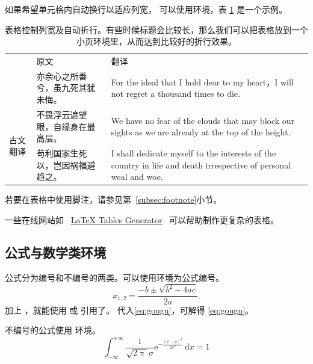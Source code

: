 如果希望单元格内自动换行以适应列宽，
可以使用环境，表 \ref{tab:tabularx} 是一个示例。
\begin{table}[htbp]
	\centering
	\begin{minipage}{0.9\textwidth}
		\caption{表格控制列宽及自动折行。有些时候标题会比较长，那么我们可以把表格放到一个小页环境里，从而达到比较好的折行效果。}
		\label{tab:tabularx}
		\begin{tabularx}{\textwidth}{p{4em}p{7.5em}X}
			\toprule
									& \multicolumn{1}{l}{原文}         & \multicolumn{1}{l}{翻译}                                                                                         \\
			\cmidrule(l){2-3}
									& 亦余心之所善兮，虽九死其犹未悔。 & For the ideal that I hold dear to my heart，I will not regret a thousand times to die.                           \\
			\cmidrule(l){2-3}
			\multirow{3}{*}{古文翻译} & 不畏浮云遮望眼，自缘身在最高层。 & We have no fear of the clouds that may block our sights as we are already at the top of the height.              \\
			\cmidrule(l){2-3}
									& 苟利国家生死以，岂因祸福避趋之。 & I shall dedicate myself to the interests of the country in life and death irrespective of personal weal and woe. \\
			\bottomrule
		\end{tabularx}
	\end{minipage}
\end{table}

若要在表格中使用脚注，请参见第~\ref{subsec:footnote}小节。

一些在线网站如
~\href{http://www.tablesgenerator.com}{LaTeX Tables Generator}~
可以帮助制作更复杂的表格。


\subsection{公式与数学类环境}\label{subsec:eqandmath}
公式分为编号和不编号的两类。可以使用环境为公式编号。
\begin{equation}\label{eq:gougu}
	x_{1,2}=\frac{{-b \pm \sqrt{{b^2}-4ac}}}{{2a}}.
\end{equation}
加上 ，就能使用 或 引用了。
代入\ref{eq:gougu}，可解得 \eqref{eq:gougu}。

不编号的公式使用  环境。
\begin{equation*}
	\int_{-\infty}^{+\infty}\frac{1}{\sqrt{2\uppi}\sigma}		%
	\mathrm{e}^{-\tfrac{(x-\mu)^2}{2\sigma^2}} \,\mathrm{d}x =1
\end{equation*}


